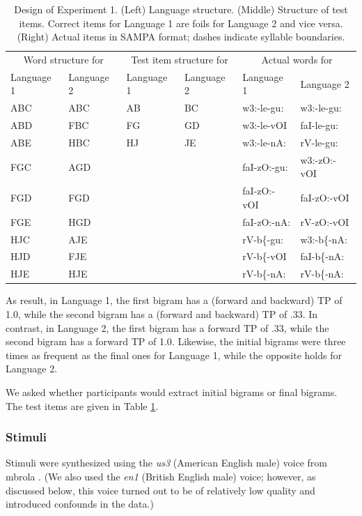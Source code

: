 \documentclass[
]{article}
\begin{document}
\begin{longtable}[t]{llllll}
\caption{\label{tab:stats-london-print-language-structure}Design of Experiment 1. (Left) Language structure. (Middle) Structure of test items. Correct items for Language 1 are foils for Language 2 and vice versa. (Right) Actual items in SAMPA format; dashes indicate syllable boundaries.}\\
\toprule
\multicolumn{2}{c}{Word structure for} & \multicolumn{2}{c}{Test item structure for} & \multicolumn{2}{c}{Actual words for} \\
Language 1 & Language 2 & Language 1 & Language 2 & Language 1 & Language 2\\
\midrule
ABC & ABC & AB & BC & w3:-le-gu: & w3:-le-gu:\\
ABD & FBC & FG & GD & w3:-le-vOI & faI-le-gu:\\
ABE & HBC & HJ & JE & w3:-le-nA: & rV-le-gu:\\
FGC & AGD &  &  & faI-zO:-gu: & w3:-zO:-vOI\\
FGD & FGD &  &  & faI-zO:-vOI & faI-zO:-vOI\\
\addlinespace
FGE & HGD &  &  & faI-zO:-nA: & rV-zO:-vOI\\
HJC & AJE &  &  & rV-b\{-gu: & w3:-b\{-nA:\\
HJD & FJE &  &  & rV-b\{-vOI & faI-b\{-nA:\\
HJE & HJE &  &  & rV-b\{-nA: & rV-b\{-nA:\\
\bottomrule
\end{longtable}

As result, in Language 1, the first bigram has a (forward and backward)
TP of 1.0, while the second bigram has a (forward and backward) TP of
.33. In contrast, in Language 2, the first bigram has a forward TP of
.33, while the second bigram has a forward TP of 1.0. Likewise, the
initial bigrams were three times as frequent as the final ones for
Language 1, while the opposite holds for Language 2.

We asked whether participants would extract initial bigrams or final
bigrams. The test items are given in Table
\ref{tab:stats-london-print-language-structure}.

\subsubsection{Stimuli}\label{stimuli}

Stimuli were synthesized using the \emph{us3} (American English male)
voice from mbrola \citep{mbrola}. (We also used the \emph{en1} (British
English male) voice; however, as discussed below, this voice turned out
to be of relatively low quality and introduced confounds in the data.)
\end{document}
